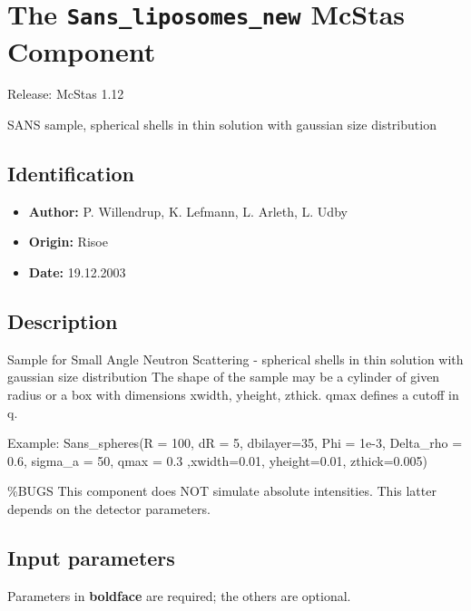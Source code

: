 \section{The \texttt{Sans\_liposomes\_new} McStas Component}
Release: McStas 1.12

SANS sample, spherical shells in thin solution with gaussian size distribution

\subsection*{Identification}
\begin{itemize}
  \item \textbf{Author:} P. Willendrup, K. Lefmann, L. Arleth, L. Udby
  \item \textbf{Origin:} Risoe
  \item \textbf{Date:} 19.12.2003
\end{itemize}

\subsection*{Description}
Sample for Small Angle Neutron Scattering - spherical shells in thin solution with gaussian size distribution The shape of the sample may be a cylinder of given radius or a box with dimensions xwidth, yheight, zthick. qmax defines a cutoff in q.

Example: Sans\_spheres(R = 100, dR = 5, dbilayer=35, Phi = 1e-3, Delta\_rho = 0.6, sigma\_a = 50, qmax = 0.3 ,xwidth=0.01, yheight=0.01, zthick=0.005)

\%BUGS This component does NOT simulate absolute intensities. This latter depends on the detector parameters.

\subsection*{Input parameters}
Parameters in \textbf{boldface} are required; the others are optional.

